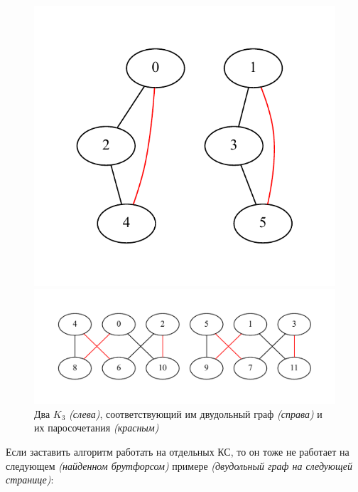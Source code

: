 \begin{figure}[h]
    \begin{minipage}[c]{0.35\textwidth}
        \centering
        \includegraphics[width=\textwidth]{images/triangles.pdf}
    \end{minipage}\hfill
    \begin{minipage}[c]{0.65\textwidth}
        \centering
        \includegraphics[width=\textwidth]{images/triangles_conv.pdf}
    \end{minipage}\hfill
    \caption{Два \(K_3\) \textit{(слева)}, соответствующий им двудольный граф \textit{(справа)} и их паросочетания \textit{(красным)}}
\end{figure}

Если заставить алгоритм работать на отдельных КС, то он тоже не работает на следующем \textit{(найденном брутфорсом)} примере \textit{(двудольный граф на следующей странице)}:

